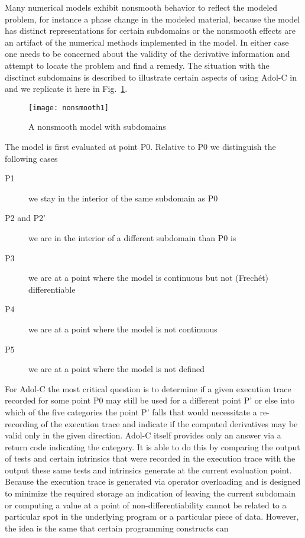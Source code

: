\documentclass{article}
\newcommand{\reffig}[1]{{Fig.~\ref{#1}}}
\begin{document}
Many numerical models exhibit nonsmooth behavior to reflect the modeled problem, 
for instance a phase change in the modeled material, because the 
model has distinct representations for certain subdomains or the nonsmooth effects 
are an artifact of the numerical methods implemented in the model.
In either case one needs to be concerned about the validity of the 
derivative information and attempt to locate the problem and  find a remedy.  
The situation with the disctinct subdomains is described to illustrate 
certain aspects of using Adol-C in \cite{adolc} and we 
replicate it here in \reffig{fig:subdomains}. 
\begin{figure}
\texttt{[image: nonsmooth1]}
\caption{A nonsmooth model with subdomains}\label{fig:subdomains} 
\end{figure}
The model is first evaluated at point P0.  Relative to P0 we distinguish the 
following cases
\begin{description}
\item[P1] we stay in the interior of the same subdomain as P0 
\item[P2 and P2'] we are in the interior of a different subdomain than P0 is
\item[P3] we are at a point where the model is continuous but not (Frech\'et) differentiable
\item[P4] we are at a point where the model is not continuous
\item[P5] we are at a point where the model is not defined
\end{description}    
For Adol-C the most critical question is to determine if a given execution trace 
recorded for some point P0 may still be used for a different point P' or else 
into which of the five categories  the point P' falls that would necessitate 
a re-recording of the execution trace and indicate if the computed derivatives 
may be valid only in the given direction. Adol-C itself provides only an answer 
via a return code indicating the category. 
It is able to do this by comparing the output of tests and certain intrinsics 
that were recorded in the execution trace with the output these same tests and intrinsics 
generate at the current evaluation point. 
Because the execution trace is generated via operator overloading and is designed to 
minimize the required storage an indication of leaving the current subdomain or computing 
a value at a point of non-differentiability cannot be related to a particular spot in 
the underlying program or a particular piece of data. 
However, the idea is the same that certain programming constructs can
\end{document}
